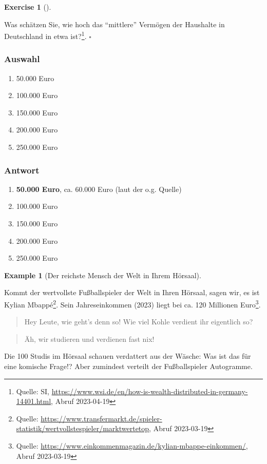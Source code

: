 \documentclass[
  letterpaper,
  DIV=11,
  numbers=noendperiod]{scrartcl}
\providecommand{\tightlist}{%
  \setlength{\itemsep}{0pt}\setlength{\parskip}{0pt}}\usepackage{longtable,booktabs,array}
\theoremstyle{definition}
\newtheorem{example}{Example}[section]
\theoremstyle{definition}
\newtheorem{exercise}{Exercise}[section]
\theoremstyle{definition}
\theoremstyle{remark}
\begin{document}
\begin{exercise}[]\protect\hypertarget{exr-mw-wealth1}{}\label{exr-mw-wealth1}

Was schätzen Sie, wie hoch das ``mittlere'' Vermögen der Haushalte in
Deutschland in etwa ist?\footnote{Quelle: SI,
  \url{https://www.wsi.de/en/how-is-wealth-distributed-in-germany-14401.html},
  Abruf 2023-04-19}. \(\square\)

\end{exercise}

\subsubsection{Auswahl}

\begin{enumerate}
\def\labelenumi{\alph{enumi})}
\tightlist
\item
  50.000 Euro
\item
  100.000 Euro
\item
  150.000 Euro
\item
  200.000 Euro
\item
  250.000 Euro
\end{enumerate}

\subsubsection{Antwort}

\begin{enumerate}
\def\labelenumi{\alph{enumi})}
\tightlist
\item
  \textbf{50.000 Euro}, ca. 60.000 Euro (laut der o.g. Quelle)
\item
  100.000 Euro
\item
  150.000 Euro
\item
  200.000 Euro
\item
  250.000 Euro
\end{enumerate}

\begin{example}[Der reichste Mensch der Welt in Ihrem
Hörsaal]\protect\hypertarget{exm-md}{}\label{exm-md}

Kommt der wertvollste Fußballspieler der Welt in Ihren Hörsaal, sagen
wir, es ist Kylian Mbappé\footnote{Quelle:
  \url{https://www.transfermarkt.de/spieler-statistik/wertvollstespieler/marktwertetop},
  Abruf 2023-03-19}. Sein Jahreseinkommen (2023) liegt bei ca. 120
Millionen Euro\footnote{Quelle:
  \url{https://www.einkommenmagazin.de/kylian-mbappe-einkommen/}, Abruf
  2023-03-19}.

\begin{quote}
{} Hey Leute, wie geht's denn so! Wie viel Kohle
verdient ihr eigentlich so?
\end{quote}

\begin{quote}
{} Äh, wir studieren und verdienen fast nix!
\end{quote}

Die 100 Studis im Hörsaal schauen verdattert aus der Wäsche: Was ist das
für eine komische Frage!? Aber zumindest verteilt der Fußballspieler
Autogramme.

\end{example}
\end{document}
